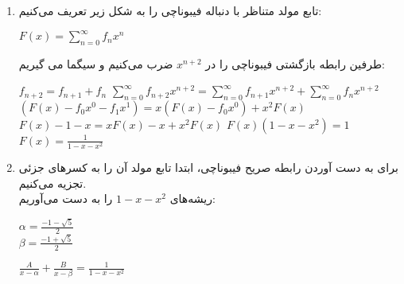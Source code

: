 \p
\begin{enumerate}

\item
                تابع مولد متناظر با دنباله فیبوناچی را به شکل زیر تعریف می‌کنیم:\\
                \begin{center}
                    $F(x) = \sum_{n = 0}^{\infty} f_nx^n$
                \end{center}
                طرفین رابطه بازگشتی فیبوناچی را در $x^{n+2}$ ضرب می‌کنیم و سیگما می گیریم:\\
                \begin{center}
                    $f_{n + 2} = f_{n + 1} + f_{n}$ \medbreak
                    $\sum_{n = 0}^{\infty} f_{n+2}x^{n+2} = \sum_{n = 0}^{\infty} f_{n+1}x^{n+2} + \sum_{n = 0}^{\infty} f_{n}x^{n+2}$    \medbreak
                    $(F(x) - f_0x^0 - f_1x^1) = x(F(x) - f_0x^0) + x^2F(x)$\medbreak
                    $F(x) - 1 - x = xF(x) - x + x^2F(x)$\medbreak
                    $F(x)(1 - x - x^2) = 1$\medbreak
                    $F(x) = \frac{1}{1 - x - x^2}$
                \end{center}
\item
                برای به دست آوردن رابطه صریح فیبوناچی، ابتدا تابع مولد آن را به کسر‌های جزئی تجزیه می‌کنیم.\\
                ریشه‌های
                $1 - x - x^2$
                را به دست می‌آوریم:\\
                \begin{center}
                    $\alpha = \frac{-1 - \sqrt{5}}{2}$ \\
                    $\beta = \frac{-1 + \sqrt{5}}{2}$
                \end{center}
                \begin{center}
                    $\frac{A}{x - \alpha} + \frac{B}{x - \beta} = \frac{1}{1 - x - x^2}$ \\
                    

\end{center}
\end{enumerate}

